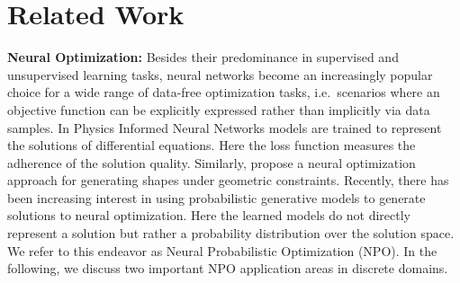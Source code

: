 \section{Related Work}
\label{sec:rel}
\textbf{Neural Optimization:} %
Besides their predominance in supervised and unsupervised learning tasks, neural networks become an increasingly popular choice for a wide range of data-free optimization tasks, i.e.~scenarios where an objective function can be explicitly expressed rather than implicitly via data samples.
In Physics Informed Neural Networks \citep{raissi2019physics} models are trained to represent the solutions of differential equations. Here the loss function measures the adherence of the solution quality.
Similarly, \citet{berzins2024geometry} propose a neural optimization approach for generating shapes under geometric constraints. %
Recently, there has been increasing interest in using probabilistic generative models to generate solutions to neural optimization. Here the learned models do not directly represent a solution but rather a probability distribution over the solution space. We refer to this endeavor as Neural Probabilistic Optimization (NPO). In the following, we discuss two important NPO application areas in discrete domains.





